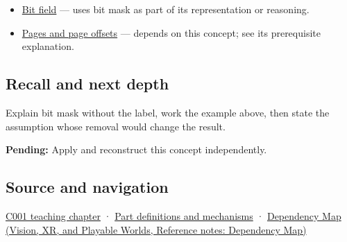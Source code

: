 \hypertarget{appendix-dbe5905163c2-used-by}{}

\begin{itemize}
\item
  \hyperref[appendix-ac697f5c66e8]{Bit field} --- uses bit mask as part of its representation or reasoning.
\item
  \hyperref[appendix-0c67cd5bf30a]{Pages and page offsets} --- depends on this concept; see its prerequisite explanation.
\end{itemize}

\subsection{Recall and next depth}\label{appendix-dbe5905163c2-recall-and-next-depth}

\hypertarget{appendix-dbe5905163c2-recall-and-next-depth}{}

Explain bit mask without the label, work the example above, then state the assumption whose removal would change the result.

\textbf{Pending:} Apply and reconstruct this concept independently.

\subsection{Source and navigation}\label{appendix-dbe5905163c2-source-and-navigation}

\hypertarget{appendix-dbe5905163c2-source-and-navigation}{}

\hyperref[01-foundations-i-ch001-from-a-signal-to-an-interpretation]{C001 teaching chapter} · \hyperref[appendix-fd090d982a15]{Part definitions and mechanisms} · \href{../07-Vision-XR-and-Playable-Worlds/main.pdf\#nameddest=appendix-4ad47bdd269a}{Dependency Map (Vision, XR, and Playable Worlds, Reference notes: Dependency Map)}
